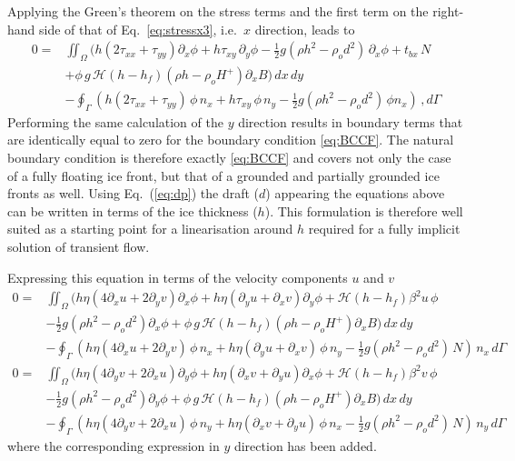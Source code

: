 \documentclass[10pt,a4paper]{book}
\newcommand{\He}{\mathcal{H}}
\newcommand{\p}{\partial}
\newcommand{\tbx}{t_{bx}}
\newcommand{\txx}{\tau_{xx}}
\newcommand{\tyy}{\tau_{yy}}
\newcommand{\txy}{\tau_{xy}}
\begin{document}
Applying the Green's theorem on the stress terms and the first term on the right-hand side of that of
Eq.~\eqref{eq:stressx3}, i.e.\ $x$ direction, leads to
\begin{align*} 
0=&\iint_{\Omega} \Big ( h ( 2 \txx + \tyy) \p_x\phi +  h \txy \, \p_y\phi - \frac{1}{2} g (\rho h^2 - \rho_o d^2) \, \p_x\phi 
+ \tbx \, N
\\ & +\phi \, g\,\He(h-h_f) (\rho h -\rho_o H^{+}) \p_x B \Big ) \, dx \, dy
\\ & - \oint_{\Gamma} (h ( 2 \txx + \tyy) \,\phi \, n_x+  h \txy \,\phi \, n_y- \frac{1}{2} g (\rho h^2 - \rho_o d^2) \,\phi n_x)\, , d\Gamma 
\end{align*}
Performing the same calculation of the $y$ direction results in
boundary terms that are identically equal to zero for the boundary
condition \eqref{eq:BCCF}. The natural boundary condition is therefore
exactly \eqref{eq:BCCF} and covers not only the case of a fully
floating ice front, but that of a grounded and partially grounded ice
fronts as well.  Using Eq.~(\ref{eq:dp}) the draft ($d$) appearing the
equations above can be written in terms of the ice thickness
($h$). This formulation is therefore well suited as a starting point
for a linearisation around $h$ required for a fully implicit solution
of transient flow.


Expressing this equation in terms of the velocity components $u$ and $v$
\begin{align} 
0=&\iint_{\Omega} (h \eta ( 4 \p_x u + 2 \p_y v ) \p_x\phi +  h \eta (\p_y u + \p_x v) \p_y\phi + \He(h-h_f) \beta^2 u \,\phi \nonumber \\
  &- \frac{1}{2} g (\rho h^2 - \rho_o d^2) \p_x\phi   +\phi \, g\,\He(h-h_f) (\rho h -\rho_o H^{+}) \p_x B ) \, dx \, dy \nonumber \\
  & - \oint_{\Gamma} (h \eta ( 4\p_x u + 2 \p_y v) \,\phi \, n_x+  h \eta (\p_y u + \p_x v) \,\phi \, n_y- \frac{1}{2} g (\rho h^2 - \rho_o d^2) \, N)\, n_x\, d\Gamma \label{eq:FEx2}\\
0=&\iint_{\Omega} (h \eta ( 4 \p_y v + 2 \p_x u ) \p_y\phi +  h \eta (\p_x v + \p_y u) \p_x\phi + \He(h-h_f) \beta^2 v \,\phi \nonumber
\\ &- \frac{1}{2} g (\rho h^2 - \rho_o d^2) \p_y\phi   +\phi \, g\,\He(h-h_f) (\rho h -\rho_o H^{+}) \p_x B ) \, dx \, dy \nonumber \\
  & - \oint_{\Gamma} (h \eta ( 4\p_y v + 2 \p_x u) \,\phi \, n_y+  h \eta (\p_x v + \p_y u) \,\phi \, n_x- \frac{1}{2} g (\rho h^2 - \rho_o d^2) \, N)\, n_y\, d\Gamma \label{eq:FEy2}
\end{align}
where the corresponding expression in $y$ direction has been added.
\end{document}
